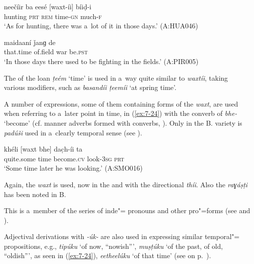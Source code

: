 \begin{exe}
\ex
\label{ex:7-22}
\gll neečíir ba eesé [waxt-íi] bíiḍ-i \\
hunting \textsc{prt} \textsc{rem} time-\textsc{gn}  much-\textsc{f} \\
\glt `As for hunting, there was a~lot of it in those days.' (A:HUA046)

\ex
\label{ex:7-23}
\gll [eetheél] maidaaní ǰanɡ de \\
that.time  of.field  war be.\textsc{pst } \\
\glt `In those days there used to be fighting in the fields.' (A:PIR005)
\end{exe}

The  of the  loan \textit{ṭeém} `time' is used in a~way quite similar to \textit{waxtíi}, taking various modifiers, such as \textit{basandíi ṭeemíi} `at spring time'.


 A number of expressions, some of them containing forms of the  \textit{waxt}, are used when referring to a~later point in time, in (\ref{ex:7-24}) with the converb of \textit{bhe-} `become' (cf. manner adverbs formed with converbs, ). Only in the B. variety is \textit{padúši} used in a~clearly temporal sense (see ).

\begin{exe}
\ex
\label{ex:7-24}
\gll khéli [waxt bhe] dac̣h-íi ta \\
quite.some time become.\textsc{cv} look-\textsc{3sg} \textsc{prt}\\
\glt `Some time later he was looking.' (A:SMO016) 
\end{exe}

 Again, the  \textit{waxt} is used, now in the  and with the directional  \textit{thíi}. Also the  \textit{raɣáṣṭi} has been noted in B.


 This is a~member of the series of
inde"= pronouns and other pro"=forms (see  and
).


Adjectival derivations with \textit{-úk-} are also used in expressing similar temporal"= propositions, e.g., \textit{tipúku} `of now, ``nowish''', \textit{muṣṭúku} `of the past, of old, ``oldish''', as seen in (\ref{ex:7-24}), \textit{eetheelúku} `of that time' (see  on p.~\pageref{tab:7-2}). 

